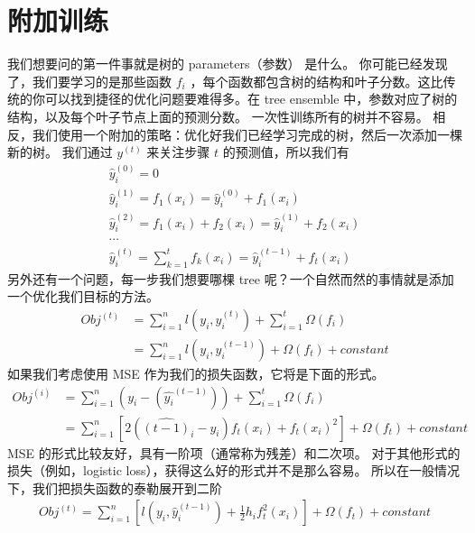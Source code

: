 \documentclass{article}
\begin{document}
\section{附加训练}
我们想要问的第一件事就是树的 parameters（参数） 是什么。 你可能已经发现了，我们要学习的是那些函数 $f_i$ ，每个函数都包含树的结构和叶子分数。这比传统的你可以找到捷径的优化问题要难得多。在 tree ensemble 中，参数对应了树的结构，以及每个叶子节点上面的预测分数。 一次性训练所有的树并不容易。 相反，我们使用一个附加的策略：优化好我们已经学习完成的树，然后一次添加一棵新的树。 我们通过 $y^{(t)}$ 来关注步骤 $t$ 的预测值，所以我们有
\begin{equation*}
	\begin{split}
		\hat{y}_i^{(0)} = 0\\
		\hat{y}_i^{(1)} = f_1(x_i)=\hat{y}_i^{(0)}+f_1(x_i)\\
		\hat{y}_i^{(2)} = f_1(x_i) + f_2(x_i) = \hat{y}_i^{(1)}+f_2(x_i)\\
		\cdots\\
		\hat{y}^{(t)}_i=\sum_{k=1}^tf_k(x_i)=\hat{y}_i^{(t-1)}+f_t(x_i)
	\end{split}
\end{equation*}
另外还有一个问题，每一步我们想要哪棵 tree 呢？一个自然而然的事情就是添加一个优化我们目标的方法。
\begin{equation*}
	\begin{split}
		Obj^{(t)}&=\sum_{i=1}^nl(y_i,\hat{y}_i^{(t)})+\sum_{i=1}^t\Omega(f_i)\\
		&=\sum_{i=1}^nl(y_i,\hat{y}_i^{(t-1)})+\Omega(f_t)+constant 
	\end{split}
\end{equation*}
如果我们考虑使用 MSE 作为我们的损失函数，它将是下面的形式。
\begin{equation*}
	\begin{split}
		Obj^{(i)}&=\sum_{i=1}^n(y_i-(\hat{y_i}^{(t-1)}))+\sum_{i=1}^t\Omega(f_i)\\
		&=\sum_{i=1}^n[2(\hat{(t-1)}_i-y_i)f_t(x_i)+f_t(x_i)^2]+\Omega(f_t)+constant 
	\end{split}
\end{equation*}
MSE 的形式比较友好，具有一阶项（通常称为残差）和二次项。 对于其他形式的损失（例如，logistic loss），获得这么好的形式并不是那么容易。 所以在一般情况下，我们把损失函数的泰勒展开到二阶
\begin{equation*}
	\begin{split}
		Obj^{(t)}=\sum_{i=1}^n[l(y_i,\hat{y}_i^{(t-1)})+\frac{1}{2}h_if_t^2(x_i)]+\Omega(f_t)+constant 
	\end{split}
\end{equation*}
\end{document}
